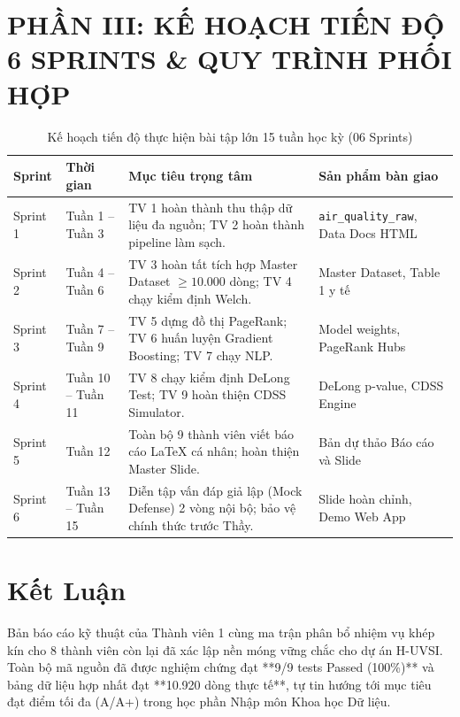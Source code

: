 \documentclass[12pt,a4paper]{article}
\begin{document}
\newpage

\section{PHẦN III: KẾ HOẠCH TIẾN ĐỘ 6 SPRINTS & QUY TRÌNH PHỐI HỢP}

\begin{table}[h]
\centering
\caption{Kế hoạch tiến độ thực hiện bài tập lớn 15 tuần học kỳ (06 Sprints)}
\label{tab:sprints}
\begin{tabularx}{\textwidth}{lp{3.5cm}Xp{3.2cm}}
\toprule
\textbf{Sprint} & \textbf{Thời gian} & \textbf{Mục tiêu trọng tâm} & \textbf{Sản phẩm bàn giao} \\
\midrule
Sprint 1 & Tuần 1 -- Tuần 3 & TV 1 hoàn thành thu thập dữ liệu đa nguồn; TV 2 hoàn thành pipeline làm sạch. & \texttt{air\_quality\_raw}, Data Docs HTML \\
Sprint 2 & Tuần 4 -- Tuần 6 & TV 3 hoàn tất tích hợp Master Dataset $\ge 10.000$ dòng; TV 4 chạy kiểm định Welch. & Master Dataset, Table 1 y tế \\
Sprint 3 & Tuần 7 -- Tuần 9 & TV 5 dựng đồ thị PageRank; TV 6 huấn luyện Gradient Boosting; TV 7 chạy NLP. & Model weights, PageRank Hubs \\
Sprint 4 & Tuần 10 -- Tuần 11 & TV 8 chạy kiểm định DeLong Test; TV 9 hoàn thiện CDSS Simulator. & DeLong p-value, CDSS Engine \\
Sprint 5 & Tuần 12 & Toàn bộ 9 thành viên viết báo cáo LaTeX cá nhân; hoàn thiện Master Slide. & Bản dự thảo Báo cáo và Slide \\
Sprint 6 & Tuần 13 -- Tuần 15 & Diễn tập vấn đáp giả lập (Mock Defense) 2 vòng nội bộ; bảo vệ chính thức trước Thầy. & Slide hoàn chỉnh, Demo Web App \\
\bottomrule
\end{tabularx}
\end{table}

\section{Kết Luận}
Bản báo cáo kỹ thuật của Thành viên 1 cùng ma trận phân bổ nhiệm vụ khép kín cho 8 thành viên còn lại đã xác lập nền móng vững chắc cho dự án H-UVSI. Toàn bộ mã nguồn đã được nghiệm chứng đạt **9/9 tests Passed (100\%)** và bảng dữ liệu hợp nhất đạt **10.920 dòng thực tế**, tự tin hướng tới mục tiêu đạt điểm tối đa (A/A+) trong học phần Nhập môn Khoa học Dữ liệu.
\end{document}
